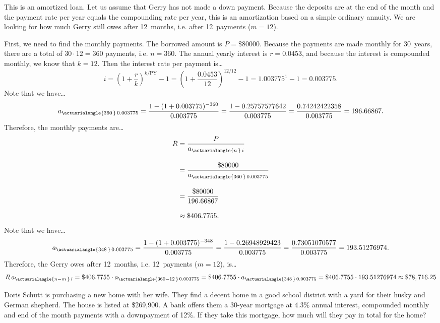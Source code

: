 \documentclass[11pt,letterpaper]{article}
\begin{document}
\sol This is an amortized loan. Let us assume that Gerry has not made a down payment. Because the deposits are at the end of the month and the payment rate per year equals the compounding rate per year, this is an amortization based on a simple ordinary annuity. We are looking for how much Gerry still owes after 12~months, i.e. after 12~payments ($m= 12$). \pspace

First, we need to find the monthly payments. The borrowed amount is $P= \$80000$. Because the payments are made monthly for 30~years, there are a total of $30 \cdot 12= 360$ payments, i.e. $n= 360$. The annual yearly interest is $r= 0.0453$, and because the interest is compounded monthly, we know that $k= 12$. Then the interest rate per payment is\dots \pspace
	\[
	i= \left( 1 + \dfrac{r}{k} \right)^{k/\text{PY}} - 1= \left( 1 + \dfrac{0.0453}{12} \right)^{12/12} - 1= 1.003775^1 - 1= 0.003775.
	\] \pspace
Note that we have\dots
	\[
	a_{\actuarialangle{360\,}\, 0.003775}= \dfrac{1 - (1 + 0.003775)^{-360}}{0.003775}= \dfrac{1 - 0.25757577642}{0.003775}= \dfrac{0.74242422358}{0.003775}= 196.66867.
	\] \pspace
Therefore, the monthly payments are\dots \pspace
	\[
	\begin{aligned}
	R&= \dfrac{P}{a_{\actuarialangle{n\,}\, i}} \\[0.3cm]
	&= \dfrac{\$80000}{a_{\actuarialangle{360\,}\, 0.003775}} \\[0.3cm]
	&= \dfrac{\$80000}{196.66867} \\[0.3cm]
	&\approx \$406.7755.
	\end{aligned}
	\] \pspace
Note that we have\dots 
	\[
	a_{\actuarialangle{348\,}\, 0.003775}= \dfrac{1 - (1 + 0.003775)^{-348}}{0.003775}= \dfrac{1 - 0.26948929423}{0.003775}= \dfrac{0.73051070577}{0.003775}= 193.51276974.
	\] \pspace
Therefore, the Gerry owes after 12~months, i.e. 12~payments ($m= 12$), is\dots \pspace
	\[
	R\,a_{\actuarialangle{n - m\,}\, i}= \$406.7755 \cdot a_{\actuarialangle{360 - 12\,}\, 0.003775}= \$406.7755 \cdot a_{\actuarialangle{348\,}\, 0.003775}= \$406.7755 \cdot 193.51276974 \approx \$78,716.25
	\]



\newpage



 Doris Schutt is purchasing a new home with her wife. They find a decent home in a good school district with a yard for their husky and German shepherd. The house is listed at \$269,900. A bank offers them a 30-year mortgage at 4.3\% annual interest, compounded monthly and end of the month payments with a downpayment of 12\%. If they take this mortgage, how much will they pay in total for the home? \pspace
\end{document}
